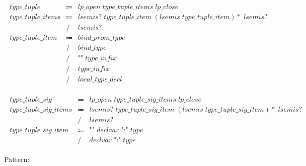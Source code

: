 \begin{align*}
    \begin{array}{rcll}
        \mathit{type\_tuple}
        &\Coloneq &\mathit{lp\_open}\; \mathit{type\_tuple\_items}\; \mathit{lp\_close} \\
        \mathit{type\_tuple\_items}
        &\Coloneq &\mathit{lsemis}{?}\; \mathit{type\_tuple\_item}\; (\mathit{lsemis}\; \mathit{type\_tuple\_item}){*}\; \mathit{lsemis}{?} \\
        &\mathrel{/} &\mathit{lsemis}{?} \\
        \mathit{type\_tuple\_item}
        &\Coloneq &\mathit{bind\_prom\_type} \\
        &\mathrel{/} &\mathit{bind\_type} \\
        &\mathrel{/} &\texttt{"\^{}"}\; \mathit{type\_infix} \\
        &\mathrel{/} &\mathit{type\_infix} \\
        &\mathrel{/} &\mathit{local\_type\_decl}
    \end{array}
\end{align*}

\begin{align*}
    \begin{array}{rcll}
        \mathit{type\_tuple\_sig}
        &\Coloneq &\mathit{lp\_open}\; \mathit{type\_tuple\_sig\_items}\; \mathit{lp\_close} \\
        \mathit{type\_tuple\_sig\_items}
        &\Coloneq &\mathit{lsemis}{?}\; \mathit{type\_tuple\_sig\_item}\; (\mathit{lsemis}\; \mathit{type\_tuple\_sig\_item}){*}\; \mathit{lsemis}{?} \\
        &\mathrel{/} &\mathit{lsemis}{?} \\
        \mathit{type\_tuple\_sig\_item}
        &\Coloneq &\texttt{"\^{}"}\; \mathit{declvar}\; \texttt{":"}\; \mathit{type} \\
        &\mathrel{/} &\mathit{declvar}\; \texttt{":"}\; \mathit{type}
    \end{array}
\end{align*}

Pattern:

